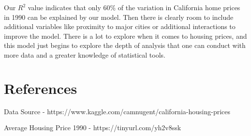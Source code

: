 \documentclass{article}
\begin{document}
Our $R^2$ value indicates that only 60\% of the variation in California home prices in 1990 can be explained by our model. Then there is clearly room to include additional variables like proximity to major cities or additional interactions to improve the model. There is a lot to explore when it comes to housing prices, and this model just begins to explore the depth of analysis that one can conduct with more data and a greater knowledge of statistical tools. 

\newpage

\section*{References}

Data Source - https://www.kaggle.com/camnugent/california-housing-prices

Average Housing Price 1990 - https://tinyurl.com/yh2v8ssk
\end{document}
